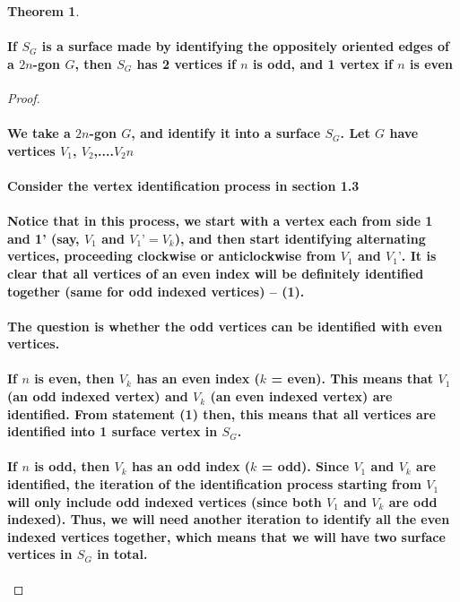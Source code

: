 \documentclass{report}
\newtheorem{theorem}{Theorem}[chapter]
\begin{document}
\begin{theorem}
{\paragraph{If $S_G$ is a surface made by identifying the oppositely oriented edges of a $2n$-gon $G$, then 
$S_G$ has 2 vertices if $n$ is odd, and 1 vertex if $n$ is even}}
\end{theorem}

\begin{proof}
{\paragraph{We take a $2n$-gon $G$, and identify it into a surface $S_G$. Let $G$ have vertices $V_1$, $V_2$,....$V_2n$}

\paragraph{Consider the vertex identification process in section 1.3}

\paragraph{Notice that in this process, we start with a vertex each from side 1 and 1’ (say, $V_1$ and $V_1’ = V_k$), and then start identifying alternating vertices, proceeding clockwise or anticlockwise from $V_1$ and $V_1’$. It is clear that all vertices of an even index will be definitely identified together (same for odd indexed vertices) -- (1).}

\paragraph{The question is whether the odd vertices can be identified with even vertices.}

\paragraph{If $n$ is even, then $V_k$ has an even index ($k$ = even). This means that $V_1$ (an odd indexed vertex) and $V_k$ (an even indexed vertex) are identified. From statement (1) then, this means that all vertices are identified into 1 surface vertex in $S_G$.}

\paragraph{If $n$ is odd, then $V_k$ has an odd index ($k$ = odd). Since $V_1$ and $V_k$ are identified, the iteration of the identification process starting from $V_1$ will only include odd indexed vertices (since both $V_1$ and $V_k$ are odd indexed). Thus, we will need another iteration to identify all the even indexed vertices together, which means that we will have two surface vertices in $S_G$ in total.}}
\end{proof}
\end{document}
